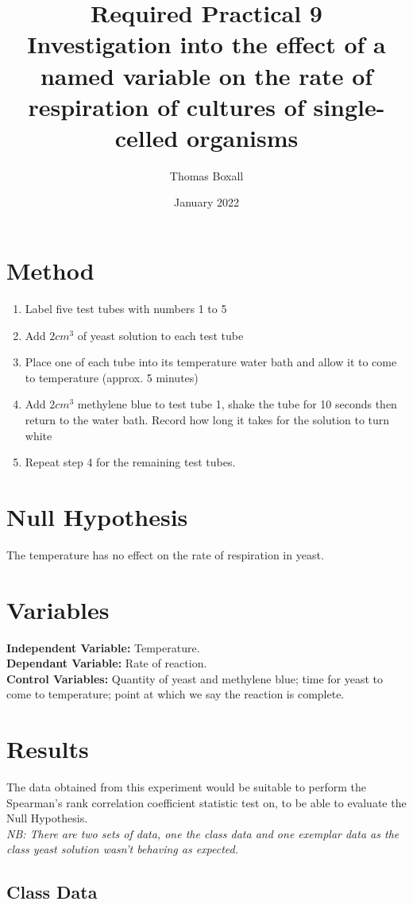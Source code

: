 \documentclass{thomasClass}
\title{\textbf{Required Practical 9}
\\Investigation into the effect of a named variable on the rate of respiration of cultures of single-celled organisms
}
\author{Thomas Boxall}
\date{January 2022}
\begin{document}
\maketitle

\section{Method}
\begin{enumerate}
    \item Label five test tubes with numbers 1 to 5
    \item Add $2cm^3$ of yeast solution to each test tube
    \item Place one of each tube into its temperature water bath and allow it to come to temperature (approx. 5 minutes)
    \item Add $2cm^3$ methylene blue to test tube 1, shake the tube for 10 seconds then return to the water bath. Record how long it takes for the solution to turn white
    \item Repeat step 4 for the remaining test tubes.
\end{enumerate}
\section{Null Hypothesis}
The temperature has no effect on the rate of respiration in yeast.

\section{Variables}
\textbf{Independent Variable: }Temperature.\\
\textbf{Dependant Variable: }Rate of reaction.\\
\textbf{Control Variables: }Quantity of yeast and methylene blue; time for yeast to come to temperature; point at which we say the reaction is complete.
\section{Results}
The data obtained from this experiment would be suitable to perform the Spearman's rank correlation coefficient statistic test on, to be able to evaluate the Null Hypothesis.\\
\textit{NB: There are two sets of data, one the class data and one exemplar data as the class yeast solution wasn't behaving as expected.}
\subsection{Class Data}
\end{document}
